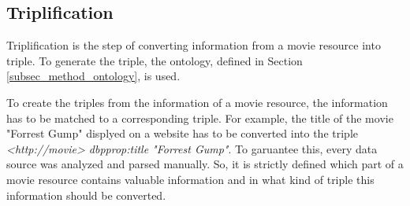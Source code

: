 \subsection{Triplification}
\label{subsec_method_triplification}

Triplification is the step of converting information from a movie resource into triple.
To generate the triple, the ontology, defined in Section \ref{subsec_method_ontology}, is used.

To create the triples from the information of a movie resource, the information has to be matched to a corresponding triple.
For example, the title of the movie "Forrest Gump" displyed on a website has to be converted into the triple \emph{<http://movie> dbpprop:title "Forrest Gump"}.
To garuantee this, every data source was analyzed and parsed manually.
So, it is strictly defined which part of a movie resource contains valuable information and in what kind of triple this information should be converted.
